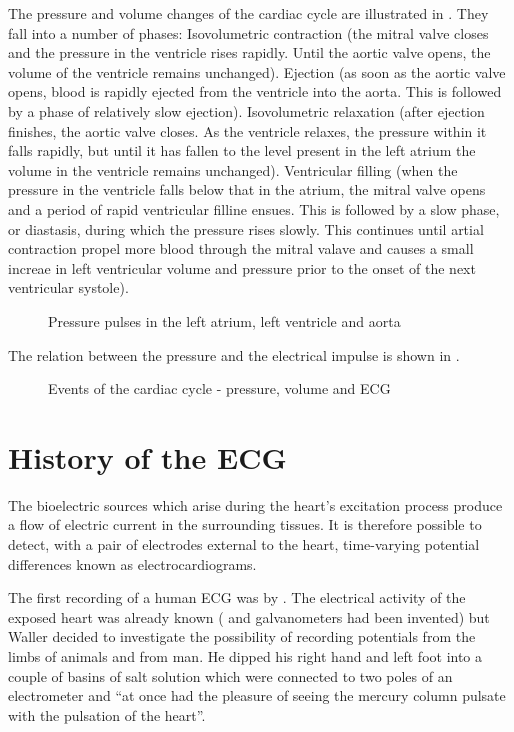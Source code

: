 The pressure and volume changes of the cardiac cycle are illustrated in
.  They fall into a number of phases:
Isovolumetric contraction (the mitral valve closes and the pressure in the
ventricle rises rapidly.  Until the aortic valve opens, the volume of the
ventricle remains unchanged).  
Ejection (as soon as the aortic valve opens, blood is rapidly ejected from the
ventricle into the aorta.  This is followed by a phase of relatively slow ejection).
Isovolumetric relaxation (after ejection finishes, the aortic valve closes.
As the ventricle relaxes, the pressure within it falls rapidly, but until it
has fallen to the level present in the left atrium the volume in the ventricle
remains unchanged).
Ventricular filling (when the pressure in the ventricle falls below that in
the atrium, the mitral valve opens and a period of rapid ventricular filline
ensues.  This is followed by a slow phase, or diastasis, during which the
pressure rises slowly.  This continues until artial contraction propel more
blood through the mitral valave and causes a small increae in left ventricular
volume and pressure prior to the onset of the next ventricular systole).
\begin{figure}[htbp] \centering
  \caption{Pressure pulses in the left atrium, left ventricle and aorta}
  \label{fig:press-vol2}
\end{figure}

The relation between the pressure and the electrical impulse is shown in 
.
\begin{figure}[htbp] \centering
  \caption{Events of the cardiac cycle - pressure, volume and ECG}
  \label{fig:press-vol}
\end{figure}

\section{History of the ECG}
The bioelectric sources which arise during the heart's excitation process
produce a flow of electric current in the surrounding tissues.  It is
therefore possible to detect, with a pair of electrodes external to the heart,
time-varying potential differences known as electrocardiograms.

The first recording of a human ECG was by . The
electrical activity of the exposed heart was already known ( and galvanometers
had been invented) but Waller decided to investigate the possibility of
recording potentials from the limbs of animals and from man.  He dipped his
right hand and left foot into a couple of basins of salt solution which were
connected to two poles of an electrometer and ``at once had the pleasure of
seeing the mercury column pulsate with the pulsation of the heart''.

